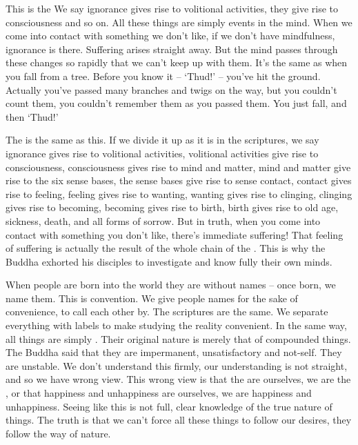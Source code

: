 This is the  We say ignorance gives rise to volitional activities, they give rise to consciousness and so on. All these things are simply events in the mind. When we come into contact with something we don't like, if we don't have mindfulness, ignorance is there. Suffering arises straight away. But the mind passes through these changes so rapidly that we can't keep up with them. It's the same as when you fall from a tree. Before you know it -- `Thud!' -- you've hit the ground. Actually you've passed many branches and twigs on the way, but you couldn't count them, you couldn't remember them as you passed them. You just fall, and then `Thud!'

The  is the same as this. If we divide it up as it is in the scriptures, we say ignorance gives rise to volitional activities, volitional activities give rise to consciousness, consciousness gives rise to mind and matter, mind and matter give rise to the six sense bases, the sense bases give rise to sense contact, contact gives rise to feeling, feeling gives rise to wanting, wanting gives rise to clinging, clinging gives rise to becoming, becoming gives rise to birth, birth gives rise to old age, sickness, death, and all forms of sorrow. But in truth, when you come into contact with something you don't like, there's immediate suffering! That feeling of suffering is actually the result of the whole chain of the . This is why the Buddha exhorted his disciples to investigate and know fully their own minds.

When people are born into the world they are without names -- once born, we name them. This is convention. We give people names for the sake of convenience, to call each other by. The scriptures are the same. We separate everything with labels to make studying the reality convenient. In the same way, all things are simply . Their original nature is merely that of compounded things. The Buddha said that they are impermanent, unsatisfactory and not-self. They are unstable. We don't understand this firmly, our understanding is not straight, and so we have wrong view. This wrong view is that the  are ourselves, we are the , or that happiness and unhappiness are ourselves, we are happiness and unhappiness. Seeing like this is not full, clear knowledge of the true nature of things. The truth is that we can't force all these things to follow our desires, they follow the way of nature.

